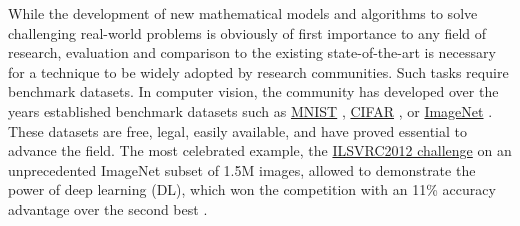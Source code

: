 \documentclass{article}
\begin{document}
While the development of new mathematical models and algorithms to solve challenging real-world problems is obviously of first importance to any field of research, evaluation and comparison to the existing state-of-the-art is necessary for a technique to be widely adopted by research communities. Such tasks require benchmark datasets. %
In computer vision, the community has developed over the years established benchmark datasets such as \href{http://yann.lecun.com/exdb/mnist/}{MNIST} \cite{mnist}, \href{https://www.cs.toronto.edu/~kriz/cifar.html}{CIFAR} \cite{cifar}, or \href{http://www.image-net.org}{ImageNet} \cite{imagenet}. These datasets are free, legal, easily available, and have proved essential to advance the field. The most celebrated example, the \href{http://www.image-net.org/challenges/LSVRC/2012/}{ILSVRC2012 challenge} on an unprecedented ImageNet subset of 1.5M images, allowed to demonstrate the power of deep learning (DL), which won the competition with an 11\% accuracy advantage over the second best \cite{convnet_imagenet}.
\end{document}
